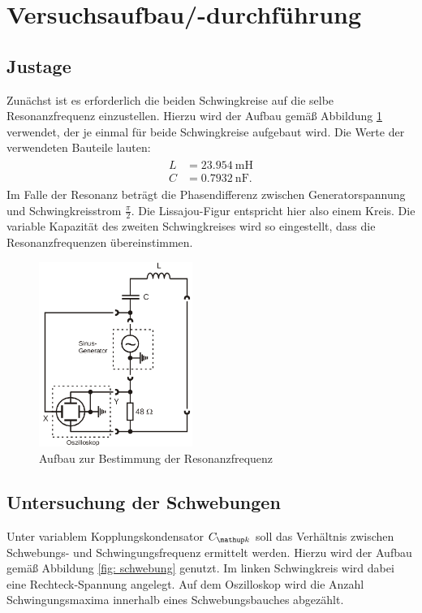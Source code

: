 \section{Versuchsaufbau/-durchführung}
\subsection{Justage}
Zunächst ist es erforderlich die beiden Schwingkreise auf die selbe Resonanzfrequenz einzustellen.
Hierzu wird der Aufbau gemäß Abbildung \ref{fig: resonanzfrequenz} verwendet, der je einmal
für beide Schwingkreise aufgebaut wird. Die Werte der verwendeten Bauteile lauten:
\begin{align}
  \label{eq: bauteile}
  \begin{aligned}
  L &= \SI{23.954}{\milli\henry} \\
  C &= \SI{0.7932}{\nano\farad}.
\end{aligned}
\end{align}
Im Falle der Resonanz beträgt die Phasendifferenz zwischen Generatorspannung und Schwingkreisstrom $\frac{\pi}{2}$.
Die Lissajou-Figur entspricht hier also einem Kreis.
Die variable Kapazität des zweiten Schwingkreises wird so eingestellt, dass
die Resonanzfrequenzen übereinstimmen.
\begin{figure}
  \centering
  \includegraphics[width = 5cm]{pics/aufbau_resonanzfrequenz.png}
  \caption{Aufbau zur Bestimmung der Resonanzfrequenz \cite{anleitung355}}
  \label{fig: resonanzfrequenz}
\end{figure}

\subsection{Untersuchung der Schwebungen}
Unter variablem Kopplungskondensator $C\ua{k}$ soll das Verhältnis zwischen Schwebungs- und Schwingungsfrequenz ermittelt werden.
Hierzu wird der Aufbau gemäß Abbildung \ref{fig: schwebung} genutzt. Im linken Schwingkreis wird dabei eine Rechteck-Spannung
angelegt. Auf dem Oszilloskop wird die Anzahl Schwingungsmaxima innerhalb eines Schwebungsbauches abgezählt.


